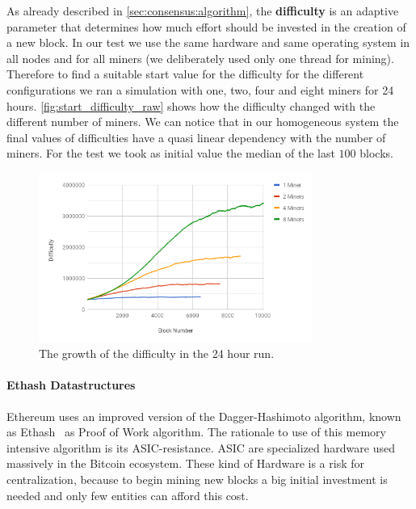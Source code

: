 As already described in \autoref{sec:consensus:algorithm}, the
\textbf{difficulty} is an adaptive parameter  that determines how much effort
should be invested in the creation of a new block. In our test we use the same
hardware and same operating system in all nodes and for all miners (we
deliberately used only one thread for mining). Therefore to find a suitable
start value for the difficulty for the different configurations we ran a
simulation with one, two, four and eight miners for 24 hours.
\autoref{fig:start_difficulty_raw} shows how the difficulty changed with the
different number of miners. We can notice that in our homogeneous system the
final values of difficulties have a quasi linear dependency with the number of
miners. For the test we took as initial value the median of the last $100$
blocks.
\begin{figure}
    \begin{center}
        \includegraphics[width=0.8\textwidth]{./res/img/start_difficulty_all.png}
        \caption{The growth of the difficulty in the 24 hour run.}
        \label{fig:start_difficulty_raw}
    \end{center}
\end{figure}

\paragraph{Ethash Datastructures} Ethereum uses an improved version of the
Dagger-Hashimoto algorithm, known as
Ethash~\cite[Appendix J]{wood2018ethereum} as Proof of Work algorithm.
The rationale to use of this memory intensive algorithm is its
ASIC-resistance. ASIC are specialized hardware used massively in the Bitcoin
ecosystem. These kind of Hardware is a risk for centralization,
because to begin mining new blocks a big initial investment is needed and
only few entities can afford this cost.

